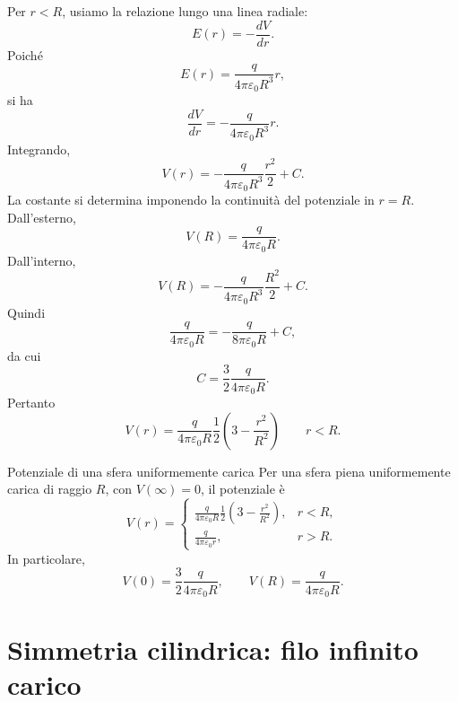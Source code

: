 \documentclass[a4paper]{article}
\begin{document}
Per \(r<R\), usiamo la relazione lungo una linea radiale:
\[
    E(r)=-\frac{dV}{dr}.
\]
Poiché
\[
    E(r)=\frac{q}{4\pi\varepsilon_0R^3}r,
\]
si ha
\[
    \frac{dV}{dr}=-\frac{q}{4\pi\varepsilon_0R^3}r.
\]
Integrando,
\[
    V(r)=-\frac{q}{4\pi\varepsilon_0R^3}\frac{r^2}{2}+C.
\]
La costante si determina imponendo la continuità del potenziale in \(r=R\). Dall'esterno,
\[
    V(R)=\frac{q}{4\pi\varepsilon_0R}.
\]
Dall'interno,
\[
    V(R)=-\frac{q}{4\pi\varepsilon_0R^3}\frac{R^2}{2}+C.
\]
Quindi
\[
    \frac{q}{4\pi\varepsilon_0R}
    =-\frac{q}{8\pi\varepsilon_0R}+C,
\]
da cui
\[
    C=\frac{3}{2}\frac{q}{4\pi\varepsilon_0R}.
\]
Pertanto
\[
    V(r)=\frac{q}{4\pi\varepsilon_0R}\frac{1}{2}\left(3-\frac{r^2}{R^2}\right)
    \qquad r<R.
\]

\begin{snippettheorem}{Potenziale di una sfera uniformemente carica}
    Per una sfera piena uniformemente carica di raggio \(R\), con \(V(\infty)=0\), il potenziale è
    \[
        V(r)=
        \begin{cases}
            \displaystyle \frac{q}{4\pi\varepsilon_0R}\frac{1}{2}\left(3-\frac{r^2}{R^2}\right), & r<R,\\[8pt]
            \displaystyle \frac{q}{4\pi\varepsilon_0r}, & r>R.
        \end{cases}
    \]
    In particolare,
    \[
        V(0)=\frac{3}{2}\frac{q}{4\pi\varepsilon_0R},
        \qquad
        V(R)=\frac{q}{4\pi\varepsilon_0R}.
    \]
\end{snippettheorem}

\begin{center}
\end{center}

\section{Simmetria cilindrica: filo infinito carico}
\end{document}
